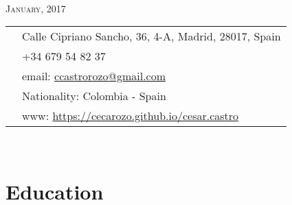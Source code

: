\documentclass[11pt]{article}\usepackage[]{graphicx}\usepackage[]{color}
\begin{document}
\par{\\
\vspace{5pt}
{\color{headings} \scshape{January, 2017}}\\
\vspace{10pt}}

\colorbox{shade}{{
\begin{tabular}{c|p{13cm}}
\vspace{5pt}\raisebox{-4pt}{\textifsymbol{18}} & Calle Cipriano Sancho, 36, 4-A, Madrid, 28017, Spain\\
\vspace{5pt}\raisebox{-4pt}{\Mobilefone} & +34 679 54 82 37\\
\vspace{5pt}\raisebox{-4pt}{\Letter} & email: \href{mailto:castrorozo@gmail.com}{ccastrorozo@gmail.com} \\
\vspace{5pt}\raisebox{-4pt}{\Aquarius} & Nationality: Colombia - Spain\\
\vspace{5pt}\raisebox{-4pt}{\Mundus} & www: \href{https://cecarozo.github.io/cesar.castro}{https://cecarozo.github.io/cesar.castro}\\
\end{tabular}
}
}\\[10pt]


\section{Education} 
\end{document}
